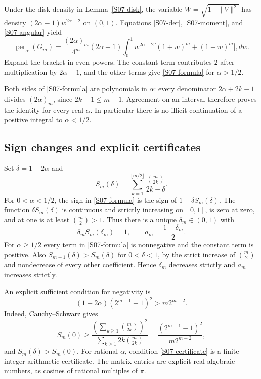 \documentclass[11pt,a4paper]{article}
\theoremstyle{definition}\newtheorem{definition}[theorem]{Definition}
\theoremstyle{remark}\newtheorem{remark}[theorem]{Remark}
\numberwithin{equation}{section}
\begin{document}
Under the disk density in Lemma~\ref{S07-disk}, the variable $W=\sqrt{1-\|V\|^2}$ has density $(2\alpha-1)w^{2\alpha-2}$ on $(0,1)$. Equations \eqref{S07-der}, \eqref{S07-moment}, and \eqref{S07-angular} yield
\[
 \operatorname{per}_\alpha(G_m)
 =\frac{(2\alpha)_m}{4^m}(2\alpha-1)
 \int_0^1w^{2\alpha-2}\bigl[(1+w)^m+(1-w)^m\bigr],dw.
\]
Expand the bracket in even powers. The constant term contributes $2$ after multiplication by $2\alpha-1$, and the other terms give \eqref{S07-formula} for $\alpha>1/2$.

Both sides of \eqref{S07-formula} are polynomials in $\alpha$: every denominator $2\alpha+2k-1$ divides $(2\alpha)_m$, since $2k-1\le m-1$. Agreement on an interval therefore proves the identity for every real $\alpha$. In particular there is no illicit continuation of a positive integral to $\alpha<1/2$.

\subsection{Sign changes and explicit certificates}\label{S07-sec-5}
Set $\delta=1-2\alpha$ and
\[
 S_m(\delta)=\sum_{k=1}^{\lfloor m/2\rfloor}\frac{\binom m{2k}}{2k-\delta}.
\]
For $0<\alpha<1/2$, the sign in \eqref{S07-formula} is the sign of $1-\delta S_m(\delta)$. The function $\delta S_m(\delta)$ is continuous and strictly increasing on $[0,1]$, is zero at zero, and at one is at least $\binom m2>1$. Thus there is a unique $\delta_m\in(0,1)$ with
\begin{equation}\label{S07-root}
 \delta_m S_m(\delta_m)=1,
 \qquad a_m=\frac{1-\delta_m}{2}.
\end{equation}
For $\alpha\ge1/2$ every term in \eqref{S07-formula} is nonnegative and the constant term is positive. Also $S_{m+1}(\delta)>S_m(\delta)$ for $0<\delta<1$, by the strict increase of $\binom m2$ and nondecrease of every other coefficient. Hence $\delta_m$ decreases strictly and $a_m$ increases strictly.

An explicit sufficient condition for negativity is
\begin{equation}\label{S07-certificate}
 (1-2\alpha)(2^{m-1}-1)^2>m2^{m-2}.
\end{equation}
Indeed, Cauchy--Schwarz gives
\[
 S_m(0)\ge
 \frac{\left(\sum_{k\ge1}\binom m{2k}\right)^2}
 {\sum_{k\ge1}2k\binom m{2k}}
 =\frac{(2^{m-1}-1)^2}{m2^{m-2}},
\]
and $S_m(\delta)>S_m(0)$. For rational $\alpha$, condition \eqref{S07-certificate} is a finite integer-arithmetic certificate. The matrix entries are explicit real algebraic numbers, as cosines of rational multiples of $\pi$.
\end{document}
